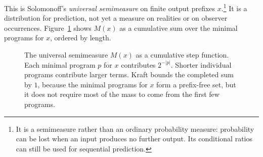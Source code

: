 This is Solomonoff's \emph{universal semimeasure} on finite output prefixes $x$.\footnote{It is a semimeasure rather than an ordinary probability measure: probability can be lost when an input produces no further output. Its conditional ratios can still be used for sequential prediction.} It is a distribution for prediction, not yet a measure on realities or on observer occurrences. Figure~\ref{fig:universal-prior} shows $M(x)$ as a cumulative sum over the minimal programs for $x$, ordered by length.

\begin{figure}[h]
\centering
{}
\caption{The universal semimeasure $M(x)$ as a cumulative step function. Each minimal program $p$ for $x$ contributes $2^{-|p|}$. Shorter individual programs contribute larger terms. Kraft bounds the completed sum by $1$, because the minimal programs for $x$ form a prefix-free set, but it does not require most of the mass to come from the first few programs.}
\label{fig:universal-prior}
\end{figure}

